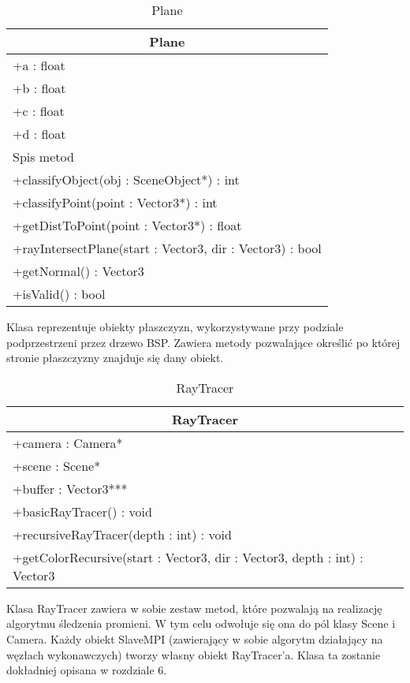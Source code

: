 \begin{longtable}{|p{16cm}|}
    \caption{Plane} \label{tab:Plane} \\ \hline
    \multicolumn{1}{|c|}{Plane} \\ \hline
    +a : float \\ 
    +b : float \\
    +c : float \\
    +d : float \\
    \hline
	Spis metod \\ 
	+classifyObject(obj : SceneObject*) : int \\
	+classifyPoint(point : Vector3*) : int \\
	+getDistToPoint(point : Vector3*) : float \\
	+rayIntersectPlane(start : Vector3, dir : Vector3) : bool \\
	+getNormal() : Vector3 \\
	+isValid() : bool \\
	\hline
\end{longtable}

Klasa reprezentuje obiekty płaszczyzn, wykorzystywane przy podziale podprzestrzeni przez drzewo BSP. Zawiera metody pozwalające określić po której stronie płaszczyzny znajduje się dany obiekt.

\begin{longtable}{|p{16cm}|}
    \caption{RayTracer} \label{tab:RayTracer} \\ \hline
    \multicolumn{1}{|c|}{RayTracer} \\ \hline
    +camera : Camera* \\
    +scene : Scene* \\
    +buffer : Vector3*** \\ \hline
	+basicRayTracer() : void \\
	+recursiveRayTracer(depth : int) : void \\
	+getColorRecursive(start : Vector3, dir : Vector3, depth : int) : Vector3 \\
	\hline
\end{longtable}

Klasa RayTracer zawiera w sobie zestaw metod, które pozwalają na realizację algorytmu śledzenia promieni. W tym celu odwołuje się ona do pól klasy Scene i Camera. Każdy obiekt SlaveMPI (zawierający w sobie algorytm działający na węzłach wykonawczych) tworzy własny obiekt RayTracer'a. Klasa ta zostanie dokładniej opisana w rozdziale 6.

